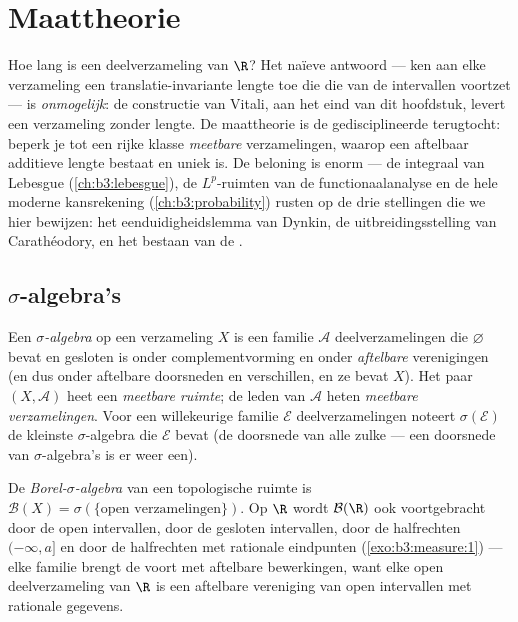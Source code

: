 \chapter{Maattheorie}\label{ch:b3:measure}

Hoe lang is een deelverzameling van $\R$? Het naïeve antwoord ---
ken aan elke verzameling een translatie-invariante lengte toe die
die van de intervallen voortzet --- is \emph{onmogelijk}: de
constructie van Vitali, aan het eind van dit hoofdstuk, levert een
verzameling zonder  lengte. De maattheorie is de
gedisciplineerde terugtocht: beperk je tot een rijke klasse
\emph{meetbare} verzamelingen, waarop een aftelbaar additieve
lengte bestaat en uniek is. De beloning is enorm --- de integraal
van Lebesgue (\cref{ch:b3:lebesgue}), de $L^p$-ruimten van de
functionaalanalyse en de hele moderne kansrekening
(\cref{ch:b3:probability}) rusten op de drie stellingen die we
hier bewijzen: het eenduidigheidslemma van Dynkin, de
uitbreidingsstelling van Carathéodory, en het bestaan van de
.

\section{$\sigma$-algebra's}

\begin{definition}\label{def:b3:measure:sigmaalgebra}
Een \emph{$\sigma$-algebra}
op een verzameling $X$ is een familie $\mathcal A$
deelverzamelingen die $\varnothing$ bevat en gesloten is onder
complementvorming en onder \emph{aftelbare} verenigingen (en dus
onder aftelbare doorsneden en verschillen, en ze bevat $X$). Het
paar $(X, \mathcal A)$ heet een \emph{meetbare ruimte}; de leden
van $\mathcal A$ heten \emph{meetbare verzamelingen}. Voor een
willekeurige familie $\mathcal E$ deelverzamelingen noteert
$\sigma(\mathcal E)$ de kleinste $\sigma$-algebra die $\mathcal E$
bevat (de doorsnede van alle zulke --- een doorsnede van
$\sigma$-algebra's is er weer een).
\end{definition}

\begin{definition}\label{def:b3:measure:borel}
De \emph{Borel-$\sigma$-algebra} van een topologische ruimte is $\mathcal
B(X) = \sigma(\{\text{open verzamelingen}\})$. Op $\R$ wordt
$\mathcal B(\R)$ ook voortgebracht door de open intervallen, door
de gesloten intervallen, door de halfrechten $(-\infty, a]$ en
door de halfrechten met rationale eindpunten
(\cref{exo:b3:measure:1}) --- elke familie brengt de  voort met aftelbare bewerkingen, want elke open
deelverzameling van $\R$ is een aftelbare vereniging van open
intervallen met rationale gegevens.
\end{definition}

